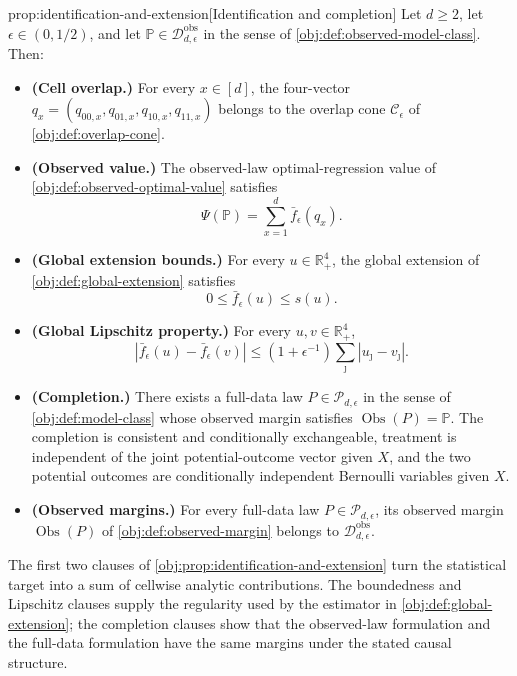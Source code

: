 \begin{propositionv}{prop:identification-and-extension}[Identification and completion]
Let \(d\ge 2\), let \(\epsilon\in(0,1/2)\), and let \(\mathbb P\in\mathcal D_{d,\epsilon}^{\mathrm{obs}}\) in the sense of \cref{obj:def:observed-model-class}. Then:
\begin{itemize}
\item \textbf{(Cell overlap.)} For every \(x\in[d]\), the four-vector \(q_x=(q_{00,x},q_{01,x},q_{10,x},q_{11,x})\) belongs to the overlap cone \(\mathcal C_\epsilon\) of \cref{obj:def:overlap-cone}.
\item \textbf{(Observed value.)} The observed-law optimal-regression value of \cref{obj:def:observed-optimal-value} satisfies
\[
\Psi(\mathbb P)=\sum_{x=1}^d \bar f_\epsilon(q_x).
\]
\item \textbf{(Global extension bounds.)} For every \(u\in\mathbb R_+^4\), the global extension of \cref{obj:def:global-extension} satisfies
\[
0\le \bar f_\epsilon(u)\le s(u).
\]
\item \textbf{(Global Lipschitz property.)} For every \(u,v\in\mathbb R_+^4\),
\[
\left|\bar f_\epsilon(u)-\bar f_\epsilon(v)\right|
\le (1+\epsilon^{-1})\sum_{\jmath}\left|u_{\jmath}-v_{\jmath}\right|.
\]
\item \textbf{(Completion.)} There exists a full-data law \(P\in\mathcal P_{d,\epsilon}\) in the sense of \cref{obj:def:model-class} whose observed margin satisfies \(\operatorname{Obs}(P)=\mathbb P\). The completion is consistent and conditionally exchangeable, treatment is independent of the joint potential-outcome vector given \(X\), and the two potential outcomes are conditionally independent Bernoulli variables given \(X\).
\item \textbf{(Observed margins.)} For every full-data law \(P\in\mathcal P_{d,\epsilon}\), its observed margin \(\operatorname{Obs}(P)\) of \cref{obj:def:observed-margin} belongs to \(\mathcal D_{d,\epsilon}^{\mathrm{obs}}\).
\end{itemize}
\end{propositionv}

The first two clauses of \cref{obj:prop:identification-and-extension} turn the statistical target into a sum of cellwise analytic contributions. The boundedness and Lipschitz clauses supply the regularity used by the estimator in \cref{obj:def:global-extension}; the completion clauses show that the observed-law formulation and the full-data formulation have the same margins under the stated causal structure.

